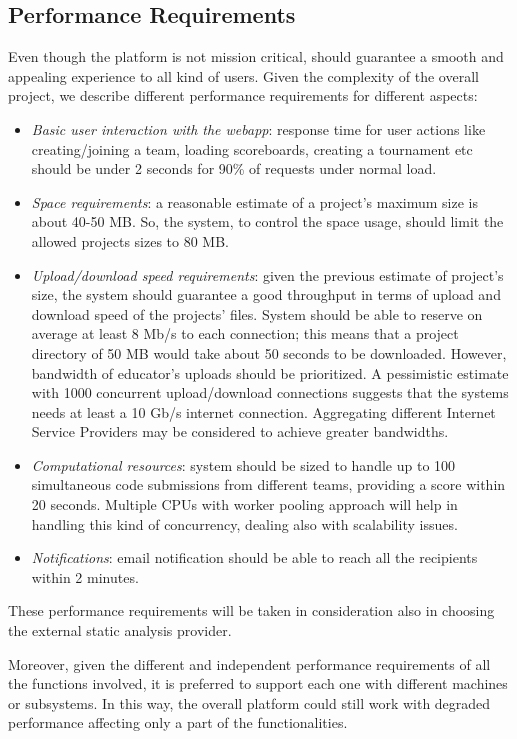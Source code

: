 \subsection{Performance Requirements}
Even though the platform is not mission critical, should guarantee a smooth and appealing experience to all kind of users. Given the complexity of the overall project, we describe different performance requirements for different aspects:
\begin{itemize}
    \item \textit{Basic user interaction with the webapp}: response time for user actions like creating/joining a team, loading scoreboards, creating a tournament etc should be under 2 seconds for 90\% of requests under normal load.
    \item \textit{Space requirements}: a reasonable estimate of a project’s maximum size is about 40-50 MB. So, the system, to control the space usage, should limit the allowed projects sizes to 80 MB.
    \item \textit{Upload/download speed requirements}: given the previous estimate of project’s size, the system should guarantee a good throughput in terms of upload and download speed of the projects’ files. System should be able to reserve on average at least 8 Mb/s to each connection; this means that a project directory of 50 MB would take about 50 seconds to be downloaded. However, bandwidth of educator’s uploads should be prioritized. A pessimistic estimate with 1000 concurrent upload/download connections suggests that the systems needs at least a 10 Gb/s internet connection. Aggregating different Internet Service Providers may be considered to achieve greater bandwidths.
    \item \textit{Computational resources}: system should be sized to handle up to 100 simultaneous code submissions from different teams, providing a score within 20 seconds. Multiple CPUs with worker pooling approach will help in handling this kind of concurrency, dealing also with scalability issues.
    \item \textit{Notifications}: email notification should be able to reach all the recipients within 2 minutes.
\end{itemize}
These performance requirements will be taken in consideration also in choosing the external static analysis provider.

Moreover, given the different and independent performance requirements of all the functions involved, it is preferred to support each one with different machines or subsystems. In this way, the overall platform could still work with degraded performance affecting only a part of the functionalities.

